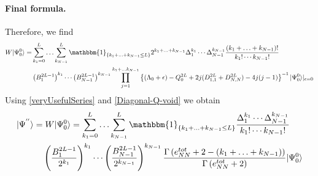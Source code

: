 \documentclass[10pt]{article}
\numberwithin{equation}{section}
\numberwithin{equation}{subsection}
\begin{document}
\paragraph{Final formula.} Therefore, we find 
\begin{equation}
	\begin{split}
		W|\Psi_{0}^{0}\rangle =&\sum_{k_{1}=0}^{L}\ldots\sum_{k_{N-1}}^{L}\mathbbm{1}_{\{k_{1}+\ldots+k_{N-1}\leq L\}}2^{k_{1}+\ldots+k_{N-1}}\Delta_{1}^{k_{1}}\cdots \Delta_{N-1}^{k_{N-1}}\frac{	(k_{1}+\ldots+k_{N-1})!}{k_{1}!\cdots k_{N-1}!}\\&
		\left(B_{1}^{2L-1}\right)^{k_{1}}\cdots\left( B_{N-1}^{2L-1}\right)^{k_{N-1}}\prod_{j=1}^{k_{1}+\ldots k_{N-1}}\left\{(\Lambda_{0}+\epsilon)-Q_{0}^{2L}+2j(D_{1,1}^{2L}+D_{N,N}^{2L})-4j(j-1)\right\}^{-1}|\Psi_{0}^{0}\rangle|_{\epsilon=0}
	\end{split}
\end{equation}
Using \eqref{veryUsefulSeries} and \eqref{Diagonal-Q-void} we obtain 
\begin{equation}
	\begin{split}
		|\Psi^{''}\rangle=&	\;W|\Psi_{0}^{0}\rangle =\sum_{k_{1}=0}^{L}\ldots\sum_{k_{N-1}}^{L}\mathbbm{1}_{\{k_{1}+\ldots+k_{N-1}\leq L\}}\frac{\Delta_{1}^{k_{1}}\cdots \Delta_{N-1}^{k_{N-1}}}{k_{1}!\cdots k_{N-1}!}\\&
		\left(\frac{B_{1}^{2L-1}}{2^{k_{1}}}\right)^{k_{1}}\cdots\left( \frac{B_{N-1}^{2L-1}}{2^{k_{N-1}}}\right)^{k_{N-1}}\frac{\Gamma\left(e_{NN}^{tot}+2-(k_{1}+\ldots+k_{N-1})\right)}{\Gamma\left(e_{NN}^{tot}+2\right)}|\Psi_{0}^{0}\rangle
	\end{split}
\end{equation}
\end{document}
